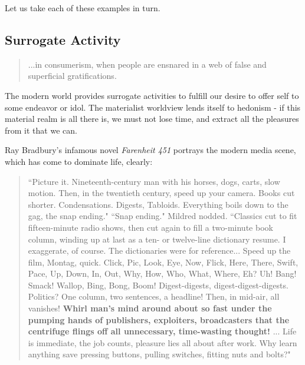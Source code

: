 \documentclass[letterpaper]{article}
\begin{document}

Let us take each of these examples in turn.


\subsection{Surrogate Activity}

\begin{quote}
  ...in consumerism, when people are ensnared in a web of false and superficial gratifications.
\end{quote}

The modern world provides surrogate activities to fulfill our desire to offer self to some endeavor or idol. The materialist worldview lends itself to hedonism - if this material realm is all there is, we must not lose time, and extract all the pleasures from it that we can. 


Ray Bradbury's infamous novel \textit{Farenheit 451} portrays the modern media scene, which has come to dominate life, clearly:

\begin{quote}
  ``Picture it. Nineteenth-century man with his horses, dogs, carts, slow motion. Then, in the twentieth century, speed up your camera. Books cut shorter. Condensations. Digests, Tabloids. Everything boils down to the gag, the snap ending." ``Snap ending." Mildred nodded. ``Classics cut to fit fifteen-minute radio shows, then cut again to fill a two-minute book column, winding up at last as a ten- or twelve-line dictionary resume. I exaggerate, of course. The dictionaries were for reference... Speed up the film, Montag, quick. Click, Pic, Look, Eye, Now, Flick, Here, There, Swift, Pace, Up, Down, In, Out, Why, How, Who, What, Where, Eh? Uh! Bang! Smack! Wallop, Bing, Bong, Boom! Digest-digests, digest-digest-digests. Politics? One column, two sentences, a headline! Then, in mid-air, all vanishes! \textbf{Whirl man’s mind around about so fast under the pumping hands of publishers, exploiters, broadcasters that the centrifuge flings off all unnecessary, time-wasting thought!} ... Life is immediate, the job counts, pleasure lies all about after work. Why learn anything save pressing buttons, pulling switches, fitting nuts and bolts?"
\end{quote}
\end{document}

